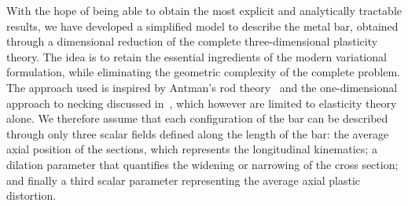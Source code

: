 \documentclass[a4paper,10pt,twoside]{amsbook}
\numberwithin{section}{chapter}
\numberwithin{equation}{chapter}
\theoremstyle{definition}
\begin{document}

With the hope of being able to obtain the most explicit and analytically tractable results, we have developed a simplified model to describe the metal bar, obtained through a dimensional reduction of the complete three-dimensional plasticity theory. The idea is to retain the essential ingredients of the modern variational formulation, while eliminating the geometric complexity of the complete problem. The approach used is inspired by Antman's rod theory~\cite{antman} and the one-dimensional approach to necking discussed in~\cite{AudolyHutchinson2020}, which however are limited to elasticity theory alone. We therefore assume that each configuration of the bar can be described through only three scalar fields defined along the length of the bar: the average axial position of the sections, which represents the longitudinal kinematics; a dilation parameter that quantifies the widening or narrowing of the cross section; and finally a third scalar parameter representing the average axial plastic distortion.
\end{document}
